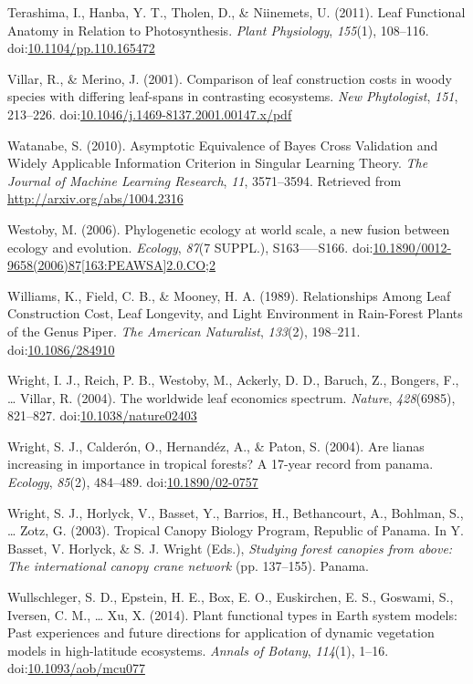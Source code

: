 \documentclass[12pt,]{article}
\theoremstyle{definition}
\theoremstyle{definition}
\theoremstyle{definition}
\theoremstyle{remark}
\begin{document}
\leavevmode\hypertarget{ref-Terashima2011}{}%
Terashima, I., Hanba, Y. T., Tholen, D., \& Niinemets, U. (2011). Leaf
Functional Anatomy in Relation to Photosynthesis. \emph{Plant
Physiology}, \emph{155}(1), 108--116.
doi:\href{https://doi.org/10.1104/pp.110.165472}{10.1104/pp.110.165472}

\leavevmode\hypertarget{ref-Villar2001}{}%
Villar, R., \& Merino, J. (2001). Comparison of leaf construction costs
in woody species with differing leaf-spans in contrasting ecosystems.
\emph{New Phytologist}, \emph{151}, 213--226.
doi:\href{https://doi.org/10.1046/j.1469-8137.2001.00147.x/pdf}{10.1046/j.1469-8137.2001.00147.x/pdf}

\leavevmode\hypertarget{ref-Watanabe2010}{}%
Watanabe, S. (2010). Asymptotic Equivalence of Bayes Cross Validation
and Widely Applicable Information Criterion in Singular Learning Theory.
\emph{The Journal of Machine Learning Research}, \emph{11}, 3571--3594.
Retrieved from \url{http://arxiv.org/abs/1004.2316}

\leavevmode\hypertarget{ref-Westoby2006}{}%
Westoby, M. (2006). Phylogenetic ecology at world scale, a new fusion
between ecology and evolution. \emph{Ecology}, \emph{87}(7 SUPPL.),
S163-----S166.
doi:\href{https://doi.org/10.1890/0012-9658(2006)87\%5B163:PEAWSA\%5D2.0.CO;2}{10.1890/0012-9658(2006)87{[}163:PEAWSA{]}2.0.CO;2}

\leavevmode\hypertarget{ref-Williams1989}{}%
Williams, K., Field, C. B., \& Mooney, H. A. (1989). Relationships Among
Leaf Construction Cost, Leaf Longevity, and Light Environment in
Rain-Forest Plants of the Genus Piper. \emph{The American Naturalist},
\emph{133}(2), 198--211.
doi:\href{https://doi.org/10.1086/284910}{10.1086/284910}

\leavevmode\hypertarget{ref-Wright2004a}{}%
Wright, I. J., Reich, P. B., Westoby, M., Ackerly, D. D., Baruch, Z.,
Bongers, F., \ldots{} Villar, R. (2004). The worldwide leaf economics
spectrum. \emph{Nature}, \emph{428}(6985), 821--827.
doi:\href{https://doi.org/10.1038/nature02403}{10.1038/nature02403}

\leavevmode\hypertarget{ref-Wright2004}{}%
Wright, S. J., Calderón, O., Hernandéz, A., \& Paton, S. (2004). Are
lianas increasing in importance in tropical forests? A 17-year record
from panama. \emph{Ecology}, \emph{85}(2), 484--489.
doi:\href{https://doi.org/10.1890/02-0757}{10.1890/02-0757}

\leavevmode\hypertarget{ref-Wright2003}{}%
Wright, S. J., Horlyck, V., Basset, Y., Barrios, H., Bethancourt, A.,
Bohlman, S., \ldots{} Zotz, G. (2003). Tropical Canopy Biology Program,
Republic of Panama. In Y. Basset, V. Horlyck, \& S. J. Wright (Eds.),
\emph{Studying forest canopies from above: The international canopy
crane network} (pp. 137--155). Panama.

\leavevmode\hypertarget{ref-Wullschleger2014}{}%
Wullschleger, S. D., Epstein, H. E., Box, E. O., Euskirchen, E. S.,
Goswami, S., Iversen, C. M., \ldots{} Xu, X. (2014). Plant functional
types in Earth system models: Past experiences and future directions for
application of dynamic vegetation models in high-latitude ecosystems.
\emph{Annals of Botany}, \emph{114}(1), 1--16.
doi:\href{https://doi.org/10.1093/aob/mcu077}{10.1093/aob/mcu077}
\end{document}
